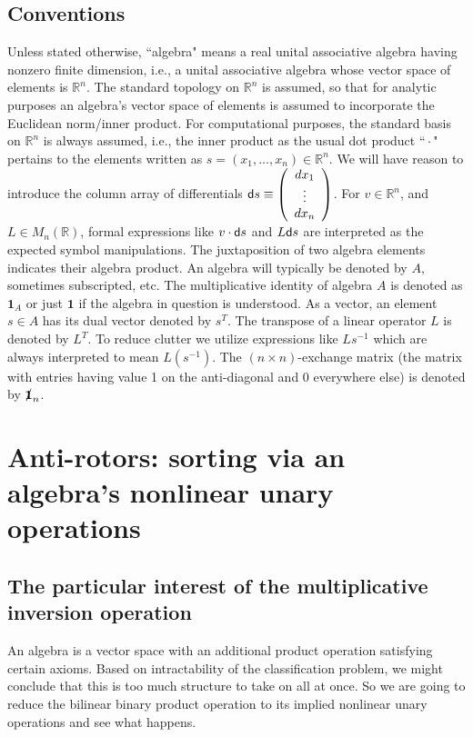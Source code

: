 \documentclass{amsart}
\numberwithin{equation}{section}
\theoremstyle{definition}
\numberwithin{theorem}{section}
\begin{document}
 
\subsection{Conventions}  Unless stated otherwise, ``algebra" means a real unital associative algebra having nonzero finite dimension, i.e., a unital associative algebra whose vector space of elements is $\mathbb{R}^n$. The standard topology on $\mathbb{R}^n$ is assumed, so that for analytic purposes an algebra's vector space of elements is assumed to incorporate the Euclidean norm/inner product.   For computational purposes, the standard basis on $\mathbb{R}^n$ is always assumed, i.e., the inner product as the usual dot product ``\,$\cdot$\," pertains to the elements written as $s=(x_1,\dots,x_n)\in\mathbb{R}^n$.  We will have reason to introduce the column array of differentials ${\sf d}s \equiv \left(\begin{array}{ccc}
dx_1   \\ 
\vdots \\
dx_n   
\end{array}\right)$.  For $v\in\mathbb{R}^n$, and $L\in M_n(\mathbb{R})$, formal expressions like $v\cdot {\sf d}s$ and $L{\sf d}s$ are interpreted as the expected symbol manipulations.   The juxtaposition of two algebra elements indicates their algebra product.  An algebra will typically be denoted by $A$, sometimes subscripted, etc. The multiplicative identity of algebra $A$ is denoted as $\mathbf{1}_A$ or just $\mathbf{1}$ if the algebra in question is understood.   As a vector, an element $s\in A$ has its dual vector denoted by $s^T$. The transpose of a linear operator $L$ is denoted by $L^T$.  To reduce clutter we utilize expressions like $Ls^{-1}$ which are always interpreted to mean $L(s^{-1})$. The $(n\times n)$-exchange matrix (the matrix with entries having value 1 on the anti-diagonal and 0 everywhere else) is denoted by  $\slashed{\bf 1}_n$.  
 

 \section{Anti-rotors: sorting via an algebra's nonlinear unary operations}
 
 \subsection{The particular interest of the multiplicative inversion operation} An algebra is a vector space with an additional product operation satisfying certain axioms.  Based on intractability of the classification problem, we might conclude that this is too much structure to take on all at once.  So we are going to reduce the bilinear binary product operation to its implied nonlinear unary operations and see what happens. 
 
\end{document}
